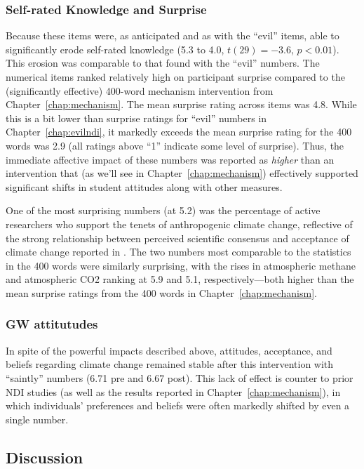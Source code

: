 \subsubsection{Self-rated Knowledge and Surprise}

Because these items were, as anticipated and as with the “evil” items, able to
significantly erode self-rated knowledge (5.3 to 4.0, $t(29)=-3.6$, $p<0.01$).
This erosion was comparable to that found with the “evil” numbers.  The
numerical items ranked relatively high on participant surprise compared to the
(significantly effective) 400-word mechanism intervention from
Chapter~\ref{chap:mechanism}.  The mean surprise rating across items was 4.8.
While this is a bit lower than surprise ratings for “evil” numbers in
Chapter~\ref{chap:evilndi}, it markedly exceeds the mean surprise rating for the
400 words was 2.9 (all ratings above “1” indicate some level of surprise). Thus,
the immediate affective impact of these numbers was reported as \emph{higher}
than an intervention that (as we'll see in Chapter~\ref{chap:mechanism})
effectively supported significant shifts in student attitudes along with other
measures.

One of the most surprising numbers (at 5.2) was the percentage of active
researchers who support the tenets of anthropogenic climate change, reflective
of the strong relationship between perceived scientific consensus and acceptance
of climate change reported in \textcite{lewandowsky_pivotal_2013}. The two
numbers most comparable to the statistics in the 400 words were similarly
surprising, with the rises in atmospheric methane and atmospheric CO2 ranking at
5.9 and 5.1, respectively---both higher than the mean surprise ratings from the
400 words in Chapter~\ref{chap:mechanism}.


\subsubsection{GW attitutudes}

In spite of the powerful impacts described above, attitudes, acceptance, and
beliefs regarding climate change remained stable after this intervention with
“saintly” numbers (6.71 pre and 6.67 post).  This lack of effect is counter to
prior NDI studies (as well as the results reported in
Chapter~\ref{chap:mechanism}), in which individuals’ preferences and beliefs
were often markedly shifted by even a single number. 

\subsection{Discussion}


